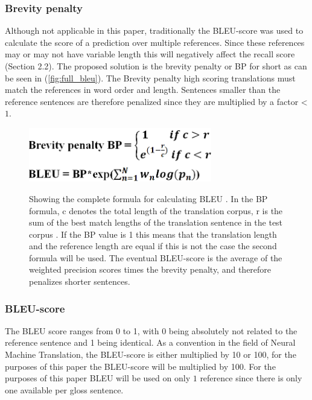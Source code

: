 \subsubsection{Brevity penalty}
Although not applicable in this paper, traditionally the BLEU-score was used to calculate the score of a prediction over multiple references. Since these references may or may not have variable length this will negatively affect the recall score \cite{papineni2002bleu} (Section 2.2). The proposed solution is the brevity penalty or BP for short as can be seen in (\autoref{fig:full_bleu}). The Brevity penalty high scoring translations must match the references in word order and length. Sentences smaller than the reference sentences are therefore penalized since they are multiplied by a factor < $1$. 


\begin{figure}[h]
 \caption{Showing the complete formula for calculating BLEU \cite{papineni2002bleu}. In the BP formula, c denotes the total length of the translation corpus, r is the sum of the best match lengths of the translation sentence in the test corpus \cite{papineni2002bleu}. If the BP value is 1 this means that the translation length and the reference length are equal if this is not the case the second formula will be used. The eventual BLEU-score is the average of the weighted precision scores times the brevity penalty, and therefore penalizes shorter sentences. }
 \centering 
 \includegraphics[width=8cm]{Bachelor CSAI thesis template/images/bleu_formula.PNG}
 \label{fig:full_bleu}
\end{figure}

\subsubsection{BLEU-score}

The BLEU score ranges from 0 to 1, with 0 being absolutely not related to the reference sentence and 1 being identical. As a convention in the field of Neural Machine Translation, the BLEU-score is either multiplied by 10 or 100, for the purposes of this paper the BLEU-score will be multiplied by 100. For the purposes of this paper BLEU will be used on only $1$ reference since there is only one available per gloss sentence.

